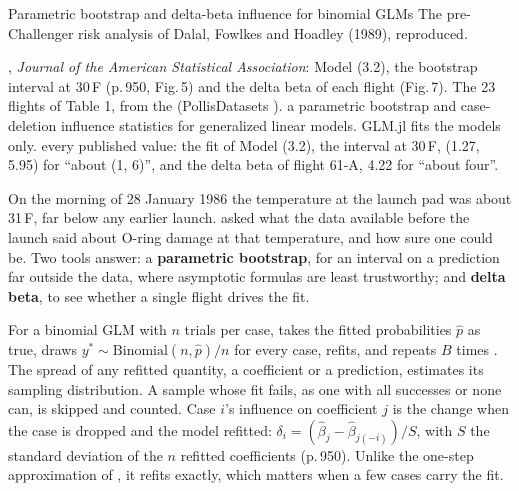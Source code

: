 



  {Parametric bootstrap and delta-beta influence for binomial GLMs}
  {The pre-Challenger risk analysis of Dalal, Fowlkes and Hoadley (1989), reproduced.}

\factsheet
  {, \emph{Journal of the American Statistical Association}: Model (3.2), the bootstrap
   interval at 30\,\textdegree F (p.\,950, Fig.\,5) and the delta beta of each flight (Fig.\,7). The 23 flights of Table 1, from the
    (PollisDatasets ).}
  {a parametric bootstrap and case-deletion influence statistics for generalized linear models. GLM.jl fits the models only.}
  {}
  {every published value: the fit of Model (3.2), the interval at 30\,\textdegree F, (1.27, 5.95) for ``about (1, 6)'', and
   the delta beta of flight 61-A, 4.22 for ``about four''.}

On the morning of 28 January 1986 the temperature at the launch pad was about 31\,\textdegree F, far below any earlier
launch.  asked what the data available before the launch said about O-ring damage at that
temperature, and how sure one could be. Two tools answer: a \textbf{parametric bootstrap}, for an interval on a prediction
far outside the data, where asymptotic formulas are least trustworthy; and \textbf{delta beta}, to see whether a single
flight drives the fit.

For a binomial GLM with $n$ trials per case,  takes the fitted probabilities $\hat p$ as true, draws
$y^* \sim \mathrm{Binomial}(n, \hat p)/n$ for every case, refits, and repeats $B$ times . The spread of any
refitted quantity, a coefficient or a prediction, estimates its sampling distribution. A sample whose fit fails, as one with
all successes or none can, is skipped and counted.
Case $i$'s influence on coefficient $j$ is the change when the case is dropped and the model refitted:
$\delta_i = (\hat\beta_j - \hat\beta_{j(-i)})/S$, with $S$ the standard deviation of the $n$ refitted coefficients (p.\,950).
Unlike the one-step approximation of , it refits exactly, which matters when a few cases carry the fit.

